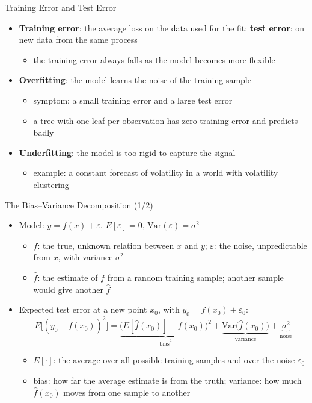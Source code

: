 \begin{frame}{Training Error and Test Error}
\itemsize{\small}
\begin{itemize}
    \item \textbf{Training error}: the average loss on the data used for the fit; \textbf{test error}: on new data from the same process
    \begin{itemize}
        \item the training error always falls as the model becomes more flexible
    \end{itemize}
    \item \textbf{Overfitting}: the model learns the noise of the training sample
    \begin{itemize}
        \item symptom: a small training error and a large test error
        \item a tree with one leaf per observation has zero training error and predicts badly
    \end{itemize}
    \item \textbf{Underfitting}: the model is too rigid to capture the signal
    \begin{itemize}
        \item example: a constant forecast of volatility in a world with volatility clustering
    \end{itemize}
\end{itemize}
\end{frame}

\begin{frame}{The Bias--Variance Decomposition (1/2)}
\itemsize{\small}
\begin{itemize}
    \item Model: $y = f(x) + \varepsilon$, $E[\varepsilon] = 0$, $\mathrm{Var}(\varepsilon) = \sigma^2$
    \begin{itemize}
        \item $f$: the true, unknown relation between $x$ and $y$; $\varepsilon$: the noise, unpredictable from $x$, with variance $\sigma^2$
        \item $\hat f$: the estimate of $f$ from a random training sample; another sample would give another $\hat f$
    \end{itemize}
    \item Expected test error at a new point $x_0$, with $y_0 = f(x_0) + \varepsilon_0$: \[ E\big[(y_0 - \hat f(x_0))^2\big] = \underbrace{\big(E[\hat f(x_0)] - f(x_0)\big)^2}_{\text{bias}^2} + \underbrace{\mathrm{Var}\big(\hat f(x_0)\big)}_{\text{variance}} + \underbrace{\sigma^2}_{\text{noise}} \]
    \begin{itemize}
        \item $E[\cdot]$: the average over all possible training samples and over the noise $\varepsilon_0$
        \item bias: how far the average estimate is from the truth; variance: how much $\hat f(x_0)$ moves from one sample to another
    \end{itemize}
\end{itemize}
\end{frame}

